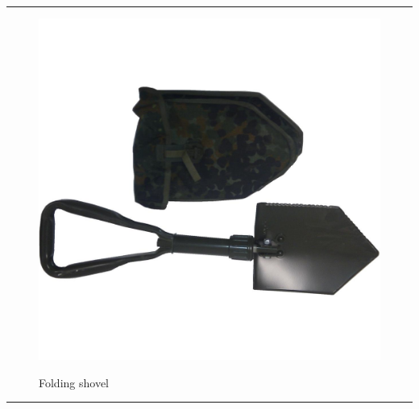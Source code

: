 \documentclass{article}
\begin{document}
    
        \par\noindent\rule{\textwidth}{0.4pt}
    \begin{figure}[H]
        \centering
        \begin{minipage}{0.25\textwidth}
            \centering
            \includegraphics[width=\textwidth]{../SurvivalItemImages/foldingshovel}
        \end{minipage}\hfill
        \begin{minipage}{0.7\textwidth}
            \centering
            \Large Folding shovel
        \end{minipage}
    \end{figure}
    \vspace{-0.8em}
    \noindent\rule{\textwidth}{0.4pt}
            
\end{document}
